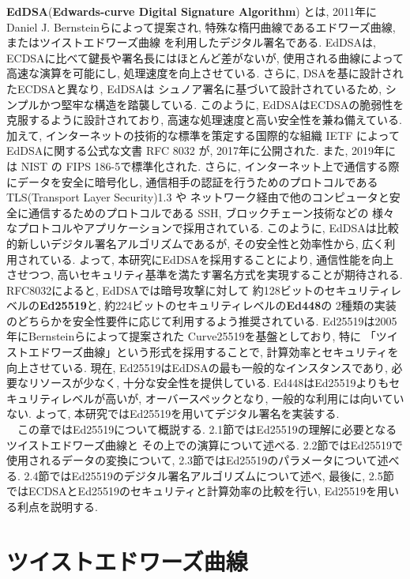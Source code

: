 \textbf{EdDSA}(\textbf{Edwards-curve Digital Signature Algorithm})
とは, 2011年にDaniel J. Bernsteinらによって提案され, 
特殊な楕円曲線であるエドワーズ曲線, またはツイストエドワーズ曲線
\cite{twisted}を利用したデジタル署名である\cite{high-speed}. 
EdDSAは, ECDSAに比べて鍵長や署名長にはほとんど差がないが, 
使用される曲線によって高速な演算を可能にし, 処理速度を向上させている. 
さらに, DSAを基に設計されたECDSAと異なり, EdDSAは
シュノア署名\cite{schnorr}に基づいて設計されているため, 
シンプルかつ堅牢な構造を踏襲している.
このように, EdDSAはECDSAの脆弱性を克服するように設計されており, 
高速な処理速度と高い安全性を兼ね備えている. 加えて, 
インターネットの技術的な標準を策定する国際的な組織 IETF によって
EdDSAに関する公式な文書 RFC 8032 \cite{8032}が, 
2017年に公開された. また, 2019年には
NIST の FIPS 186-5で標準化された. さらに, 
インターネット上で通信する際にデータを安全に暗号化し, 
通信相手の認証を行うためのプロトコルである 
TLS(Transport Layer Security)1.3 \cite{rfc8446}や
ネットワーク経由で他のコンピュータと安全に通信するためのプロトコルである 
SSH, ブロックチェーン技術\cite{monero}などの
様々なプロトコルやアプリケーションで採用されている. 
このように, EdDSAは比較的新しいデジタル署名アルゴリズムであるが, 
その安全性と効率性から, 広く利用されている. 
よって, 本研究にEdDSAを採用することにより, 通信性能を向上させつつ, 
高いセキュリティ基準を満たす署名方式を実現することが期待される.\\
\indent RFC8032によると, EdDSAでは暗号攻撃に対して
約128ビットのセキュリティレベルの\textbf{Ed25519}と, 
約224ビットのセキュリティレベルの\textbf{Ed448}の
2種類の実装のどちらかを安全性要件に応じて利用するよう推奨されている. 
Ed25519は2005年にBernsteinらによって提案された
Curve25519\cite{curve25519}を基盤としており, 特に
「ツイストエドワーズ曲線」という形式を採用することで, 
計算効率とセキュリティを向上させている. 
現在, Ed25519はEdDSAの最も一般的なインスタンスであり, 
必要なリソースが少なく, 十分な安全性を提供している. 
Ed448はEd25519よりもセキュリティレベルが高いが, 
オーバースペックとなり, 一般的な利用には向いていない. 
よって, 本研究ではEd25519を用いてデジタル署名を実装する.\\
　この章ではEd25519について概説する. 
2.1節ではEd25519の理解に必要となるツイストエドワーズ曲線と
その上での演算について述べる. 
2.2節ではEd25519で使用されるデータの変換について, 
2.3節ではEd25519のパラメータについて述べる. 
2.4節ではEd25519のデジタル署名アルゴリズムについて述べ, 
最後に, 2.5節ではECDSAとEd25519のセキュリティと計算効率の比較を行い, 
Ed25519を用いる利点を説明する.\\
\section{ツイストエドワーズ曲線}

